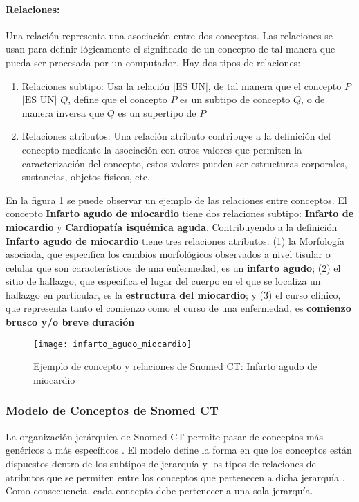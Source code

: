 \paragraph{Relaciones:}
Una relación representa una asociación entre dos conceptos. Las relaciones se usan para definir lógicamente el significado de un concepto de tal manera que pueda ser procesada por un computador. Hay dos tipos de relaciones:

\begin{enumerate}
\item Relaciones subtipo: Usa la relación $|\text{ES UN}|$, de tal manera que el concepto $P$ $|\text{ES UN}|$ $Q$,  define que el concepto $P$ es un subtipo de concepto $Q$, o de manera inversa que $Q$ es un supertipo de $P$
\item Relaciones atributos: Una relación atributo contribuye a la definición del concepto mediante la asociación con otros valores que permiten la caracterización del concepto, estos valores pueden ser estructuras corporales, sustancias, objetos físicos, etc.
\end{enumerate}

En la figura \ref{fig:IAM} se puede observar un ejemplo de las relaciones entre conceptos. El concepto \textbf{Infarto agudo de miocardio} tiene dos relaciones subtipo:\textbf{ Infarto de miocardio} y \textbf{Cardiopatía isquémica aguda}. Contribuyendo a la definición \textbf{Infarto agudo de miocardio} tiene tres relaciones atributos: (1) la Morfología asociada, que especifica los cambios morfológicos observados a nivel tisular o celular que
son característicos de una enfermedad, es un \textbf{infarto agudo}; (2) el sitio de hallazgo, que especifica el lugar del cuerpo en el que se localiza un hallazgo en particular, es la \textbf{estructura del miocardio}; y (3) el curso clínico, que representa tanto el comienzo como el curso de una enfermedad, es \textbf{comienzo brusco y/o breve duración}

\begin{figure}
\caption{Ejemplo de concepto y relaciones de Snomed CT: Infarto agudo de miocardio}
\label{fig:IAM}
\centering
\texttt{[image: infarto\_agudo\_miocardio]}
\end{figure}


\subsubsection{Modelo de Conceptos de Snomed CT}
La organización jerárquica de Snomed CT permite pasar de conceptos más genéricos a más específicos \cite{Bhattacharyya2016}. El modelo define la forma en que los conceptos están dispuestos dentro de los subtipos de jerarquía y los tipos de relaciones de atributos que se permiten entre los conceptos que pertenecen a dicha jerarquía \cite{Bhattacharyya2016,ihtsdo2016SG}. Como consecuencia, cada concepto debe pertenecer a una sola jerarquía.
% 
% 
 
